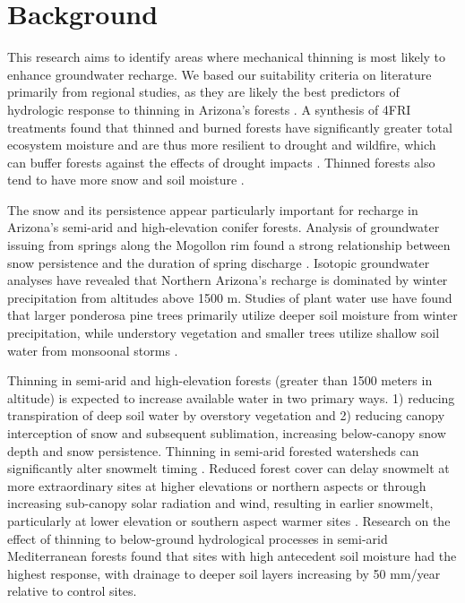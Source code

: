 \documentclass[
  number,
  preprint,
  3p,
  onecolumn]{elsarticle}
\begin{document}
\section{Background}\label{background}

This research aims to identify areas where mechanical thinning is most
likely to enhance groundwater recharge. We based our suitability
criteria on literature primarily from regional studies, as they are
likely the best predictors of hydrologic response to thinning in
Arizona's forests \citep{wyatt_estimating_2013}. A synthesis of 4FRI
treatments found that thinned and burned forests have significantly
greater total ecosystem moisture and are thus more resilient to drought
and wildfire, which can buffer forests against the effects of drought
impacts \citep{sankey_thinning_2022, sankey_regionalscale_2021}. Thinned
forests also tend to have more snow and soil moisture
\citep{odonnell_vegetation_2021}.

The snow and its persistence appear particularly important for recharge
in Arizona's semi-arid and high-elevation conifer forests. Analysis of
groundwater issuing from springs along the Mogollon rim found a strong
relationship between snow persistence and the duration of spring
discharge \citep{donovan2022}. Isotopic groundwater analyses have
revealed that Northern Arizona's recharge is dominated by winter
precipitation from altitudes above 1500
m\citep{eastoe2007, eastoe2023, earman2006, blasch2006}. Studies of
plant water use have found that larger ponderosa pine trees primarily
utilize deeper soil moisture from winter precipitation, while understory
vegetation and smaller trees utilize shallow soil water from monsoonal
storms \citep{kerhoulas2013, kerhoulas2023}.

Thinning in semi-arid and high-elevation forests (greater than 1500
meters in altitude) is expected to increase available water in two
primary ways. 1) reducing transpiration of deep soil water by overstory
vegetation and 2) reducing canopy interception of snow and subsequent
sublimation, increasing below-canopy snow depth and snow persistence.
Thinning in semi-arid forested watersheds can significantly alter
snowmelt timing \citep{dwivedi2024}. Reduced forest cover can delay
snowmelt at more extraordinary sites at higher elevations or northern
aspects or through increasing sub-canopy solar radiation and wind,
resulting in earlier snowmelt, particularly at lower elevation or
southern aspect warmer sites \citep{biederman_recent_2015, dwivedi2024}.
Research on the effect of thinning to below-ground hydrological
processes in semi-arid Mediterranean forests found that sites with high
antecedent soil moisture had the highest response, with drainage to
deeper soil layers increasing by 50 mm/year relative to control
sites\citep{del_campo_effectiveness_2019}.
\end{document}
